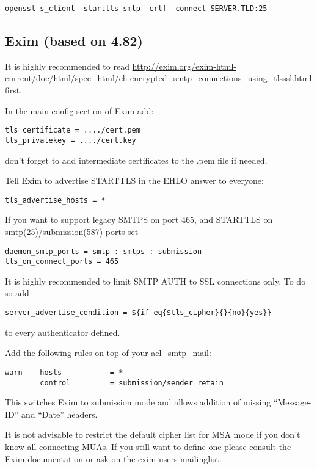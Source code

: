 \begin{lstlisting}
openssl s_client -starttls smtp -crlf -connect SERVER.TLD:25
\end{lstlisting}


\subsection{Exim (based on 4.82)}
It is highly recommended to read
\url{http://exim.org/exim-html-current/doc/html/spec_html/ch-encrypted_smtp_connections_using_tlsssl.html}
first.

In the main config section of Exim add:

\begin{lstlisting}
tls_certificate = ..../cert.pem
tls_privatekey = ..../cert.key
\end{lstlisting}
don't forget to add intermediate certificates to the .pem file if needed.

Tell Exim to advertise STARTTLS in the EHLO answer to everyone:
\begin{lstlisting}
tls_advertise_hosts = *
\end{lstlisting}

If you want to support legacy SMTPS on port 465, and STARTTLS on smtp(25)/submission(587) ports set
\begin{lstlisting}
daemon_smtp_ports = smtp : smtps : submission
tls_on_connect_ports = 465
\end{lstlisting}

It is highly recommended to limit SMTP AUTH to SSL connections only. To do so add
\begin{lstlisting}
server_advertise_condition = ${if eq{$tls_cipher}{}{no}{yes}}
\end{lstlisting}
to every authenticator defined.

Add the following rules on top of your acl\_smtp\_mail:
\begin{lstlisting}
warn    hosts           = *
        control         = submission/sender_retain
\end{lstlisting}
This switches Exim to submission mode and allows addition of missing ``Message-ID'' and ``Date'' headers.

It is not advisable to restrict the default cipher list for MSA mode if you don't know all connecting MUAs. If you still want to define one please consult the Exim documentation or ask on the exim-users mailinglist.

